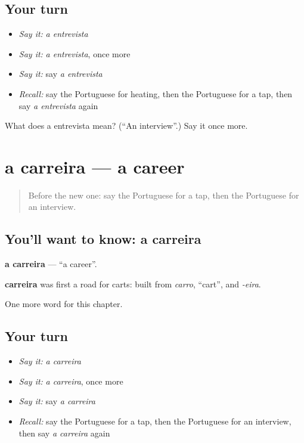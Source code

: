 \subsection*{Your turn}
\begin{itemize}
\raggedright
  \item \emph{Say it:} \emph{a entrevista}
  \item \emph{Say it:} \emph{a entrevista}, once more
  \item \emph{Say it:} say \emph{a entrevista}
  \item \emph{Recall:} say the Portuguese for heating, then the Portuguese for a tap, then say \emph{a entrevista} again
\end{itemize}

\begin{tcolorbox}[breakable,colback=teal!4,colframe=teal!35!black,title={Before you move on}]
What does a entrevista mean? (\textquotedblleft{}An interview\textquotedblright{}.) Say it once more.
\end{tcolorbox}
\section[a carreira]{a carreira — a career}

\label{lesson:PT-C200-carreira}



\begin{quote}
Before the new one: say the Portuguese for a tap, then the Portuguese for an interview.
\end{quote}

\subsection*{You'll want to know: a carreira}
\textbf{a carreira} — \textquotedblleft{}a career\textquotedblright{}.

\begin{cousinweb}
\textbf{carreira} was first a road for carts: built from \emph{carro}, \textquotedblleft{}cart\textquotedblright{}, and \emph{-eira}.
\end{cousinweb}

\begin{grammarlens}[title={What you've built}]
One more word for this chapter.
\end{grammarlens}

\subsection*{Your turn}
\begin{itemize}
\raggedright
  \item \emph{Say it:} \emph{a carreira}
  \item \emph{Say it:} \emph{a carreira}, once more
  \item \emph{Say it:} say \emph{a carreira}
  \item \emph{Recall:} say the Portuguese for a tap, then the Portuguese for an interview, then say \emph{a carreira} again
\end{itemize}

